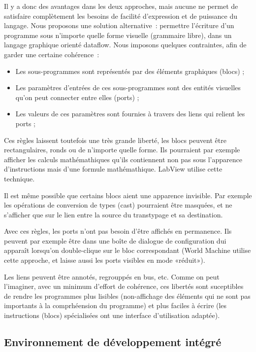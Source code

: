 \documentclass{article}
\begin{document}
Il y a donc des avantages dans les deux approches, mais aucune ne permet de satisfaire complètement les besoins de facilité d'expression et
de puissance du langage. Nous proposons une solution alternative~: permettre l'écriture d'un programme sous n'importe quelle forme visuelle
(grammaire libre), dans un langage graphique orienté dataflow. Nous imposons quelques contraintes, afin de garder une certaine cohérence~:
\begin{itemize}
\item Les sous-programmes sont représentés par des éléments graphiques (blocs) ;
\item Les paramètres d'entrées de ces sous-programmes sont des entités visuelles qu'on peut connecter entre elles (ports) ;
\item Les valeurs de ces paramètres sont fournies à travers des liens qui relient les ports ;
\end{itemize}
Ces règles laissent toutefois une très grande liberté, les blocs peuvent être rectangulaires, ronds ou de n'importe quelle forme. Ils
pourraient par exemple afficher les calculs mathémathiques qu'ils contiennent non pas sous l'apparence d'instructions mais d'une formule
mathémathique. LabView utilise cette technique.

Il est même possible que certains blocs aient une apparence invisible. Par exemple les opérations de conversion de types (cast) pourraient
être masquées, et ne s'afficher que sur le lien entre la source du transtypage et sa destination.

Avec ces règles, les ports n'ont pas besoin d'être affichés en permanence. Ils peuvent par exemple être dans une boîte de dialogue de
configuration dui apparaît lorsqu'on double-clique sur le bloc correspondant (World Machine utilise cette approche, et laisse aussi les
ports visibles en mode «réduit»).

Les liens peuvent être annotés, regrouppés en bus, etc. Comme on peut l'imaginer, avec un minimum d'effort de cohérence, ces libertés sont
suceptibles de rendre les programmes plus lisibles (non-affichage des éléments qui ne sont pas importants à la comprhéension du programme)
et plus faciles à écrire (les instructions (blocs) spécialisées ont une interface d'utilisation adaptée).

\subsection{Environnement de développement intégré}
\end{document}
